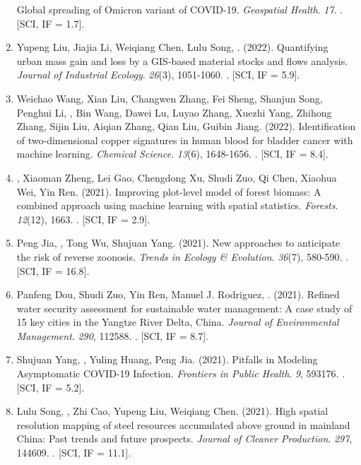 \begin{enumerate}
    Global spreading of Omicron variant of COVID-19.
    \textit{Geospatial Health}. \textit{17}.
    . [SCI, IF = 1.7].
\item
    Yupeng Liu, Jiajia Li, Weiqiang Chen, Lulu Song, \Shaoqing. (2022).
    Quantifying urban mass gain and loss by a GIS‐based material stocks and flows analysis.
    \textit{Journal of Industrial Ecology}. \textit{26}(3), 1051-1060.
    . [SCI, IF = 5.9].
\item
    Weichao Wang, Xian Liu, Changwen Zhang, Fei Sheng, Shanjun Song, Penghui Li, \Shaoqing, Bin Wang, Dawei Lu, Luyao Zhang, Xuezhi Yang, Zhihong Zhang, Sijin Liu, Aiqian Zhang, Qian Liu, Guibin Jiang. (2022).
    Identification of two-dimensional copper signatures in human blood for bladder cancer with machine learning.
    \textit{Chemical Science}. \textit{13}(6), 1648-1656.
    . [SCI, IF = 8.4].
\item
    \Shaoqing\CF, Xiaoman Zheng\CF, Lei Gao, Chengdong Xu, Shudi Zuo, Qi Chen, Xiaohua Wei, Yin Ren. (2021).
    Improving plot-level model of forest biomass: A combined approach using machine learning with spatial statistics.
    \textit{Forests}. \textit{12}(12), 1663.
    . [SCI, IF = 2.9].
\item
    Peng Jia, \Shaoqing, Tong Wu, Shujuan Yang. (2021).
    New approaches to anticipate the risk of reverse zoonosis.
    \textit{Trends in Ecology \& Evolution}. \textit{36}(7), 580-590.
    . [SCI, IF = 16.8].
\item
    Panfeng Dou, Shudi Zuo, Yin Ren, Manuel J. Rodriguez, \Shaoqing. (2021).
    Refined water security assessment for sustainable water management: A case study of 15 key cities in the Yangtze River Delta, China.
    \textit{Journal of Environmental Management}. \textit{290}, 112588.
    . [SCI, IF = 8.7].
\item
    Shujuan Yang, \Shaoqing, Yuling Huang, Peng Jia. (2021).
    Pitfalls in Modeling Asymptomatic COVID-19 Infection.
    \textit{Frontiers in Public Health}. \textit{9}, 593176.
    . [SCI, IF = 5.2].
\item
    Lulu Song, \Shaoqing, Zhi Cao, Yupeng Liu, Weiqiang Chen. (2021).
    High spatial resolution mapping of steel resources accumulated above ground in mainland China: Past trends and future prospects.
    \textit{Journal of Cleaner Production}. \textit{297}, 144609.
    . [SCI, IF = 11.1].

\end{enumerate}
